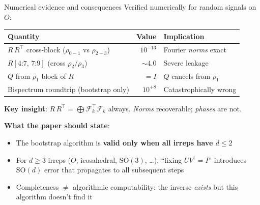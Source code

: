 \documentclass[aspectratio=169]{beamer}
\begin{document}
\begin{frame}{Numerical evidence and consequences}
  Verified numerically for random signals on $O$:

  \smallskip

  {\small
  \begin{tabular}{lrl}
    \toprule
    \textbf{Quantity} & \textbf{Value} & \textbf{Implication} \\
    \midrule
    $R\,R^\top$ cross-block ($\rho_{0{-}1}$ vs $\rho_{2{-}3}$) & $10^{-13}$ & Fourier \emph{norms} exact \\
    $R[\text{4:7, 7:9}]$ (cross $\rho_2/\rho_3$) & ${\sim}4.0$ & Severe leakage \\
    $Q$ from $\rho_1$ block of $R$ & $= I$ & $Q$ cancels from $\rho_1$ \\
    Bispectrum roundtrip (bootstrap only) & $10^{+8}$ & Catastrophically wrong \\
    \bottomrule
  \end{tabular}
  }

  \medskip

  \textbf{Key insight}: $R\,R^\top = \bigoplus \mathcal{F}_k^\top \mathcal{F}_k$ always.
  \emph{Norms} recoverable; \emph{phases} are not.

  \medskip

  \textbf{What the paper should state}:
  \begin{itemize}\small
    \item The bootstrap algorithm is \textbf{valid only when all irreps
          have $d \leq 2$}
    \item For $d \geq 3$ irreps ($O$, icosahedral, $\mathrm{SO}(3)$, \ldots),
          ``fixing $UV^\dagger = I$'' introduces $\mathrm{SO}(d)$ error
          that propagates to all subsequent steps
    \item Completeness $\neq$ algorithmic computability:
          the inverse \emph{exists} but this algorithm doesn't find it
  \end{itemize}
\end{frame}
\end{document}

